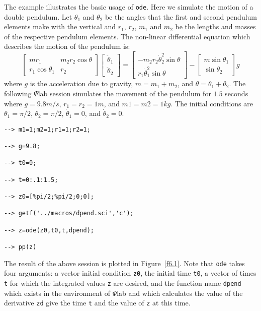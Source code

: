 	The example illustrates the basic usage of {\tt ode}.
Here we simulate the motion of a double pendulum.  
Let $\theta_1$ and $\theta_2$ be the angles that the first
and second pendulum elements make with the vertical and
$r_1$, $r_2$, $m_1$
and $m_2$ be the lengths and masses of 
the respective pendulum elements.  
The non-linear
differential equation which describes the motion of the pendulum
is:
\begin{equation}
\left[\begin{array}{cc}
mr_1&m_2r_2\cos\theta\\
r_1\cos\theta_1&r_2
\end{array}\right]
\left[\begin{array}{c}
\ddot{\theta}_1\\
\ddot{\theta}_2
\end{array}\right]
=
\left[\begin{array}{c}
-m_2r_2\dot{\theta}_2^2\sin\theta\\
r_1\dot{\theta}_1^2\sin\theta
\end{array}\right]
-
\left[\begin{array}{c}
m\sin\theta_1\\
\sin\theta_2
\end{array}\right]
g
\label{e6.1}
\end{equation}
where $g$ is the acceleration due to gravity, $m=m_1+m_2$, and 
$\theta=\theta_1+\theta_2$.
The following $\Psi$lab session simulates the movement
of the pendulum for $1.5$ seconds where $g=9.8m/s$,
$r_1=r_2=1m$, and $m1=m2=1kg$.  The initial conditions are
$\theta_1=\pi/2$, $\theta_2=\pi/2$, $\dot{\theta}_1=0$, and 
$\dot{\theta}_2=0$.
\begin{verbatim}
--> m1=1;m2=1;r1=1;r2=1;
 
--> g=9.8;
 
--> t0=0;
 
--> t=0:.1:1.5;
 
--> z0=[%pi/2;%pi/2;0;0];
 
--> getf('../macros/dpend.sci','c');
 
--> z=ode(z0,t0,t,dpend);
 
--> pp(z)
\end{verbatim}
The result of the above session is plotted in Figure~\ref{f6.1}.
Note that {\tt ode} takes four arguments: a vector initial condition
{\tt z0}, the initial time {\tt t0}, a vector of times {\tt t}
for which the integrated values {\tt z} are desired, and the function
name {\tt dpend} which exists in the environment of $\Psi$lab and which
calculates the value of the derivative {\tt zd} give the time {\tt t} 
and the value of {\tt z} at this time.


